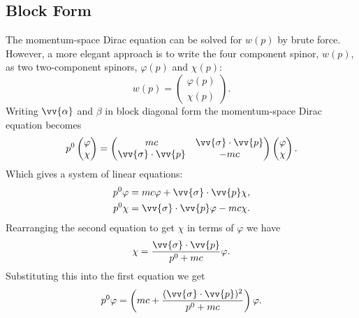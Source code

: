 \documentclass[fleqn]{NotesClass}
\begin{document}
    \subsection{Block Form}
    The momentum-space Dirac equation can be solved for \(w(p)\) by brute force.
    However, a more elegant approach is to write the four component spinor, \(w(p)\), as two two-component spinors, \(\varphi(p)\) and \(\chi(p)\):
    \begin{equation}
        w(p) = 
        \begin{pmatrix}
            \varphi(p)\\ \chi(p)
        \end{pmatrix}
        .
    \end{equation}
    Writing \(\vv{\alpha}\) and \(\beta\) in block diagonal form the momentum-space Dirac equation becomes
    \begin{equation}
        p^0
        \begin{pmatrix}
            \varphi\\ \chi
        \end{pmatrix}
        =
        \begin{pmatrix}
            mc & \vv{\sigma} \cdot \vv{p}\\
            \vv{\sigma} \cdot \vv{p} & -mc
        \end{pmatrix}
        \begin{pmatrix}
            \varphi\\ \chi
        \end{pmatrix}
        .
    \end{equation}
    Which gives a system of linear equations:
    \begin{align}
        p^0\varphi &= mc\varphi + \vv{\sigma}\cdot\vv{p} \chi,\label{eqn:dirac eqn solution step eq1}\\
        p^0\chi &= \vv{\sigma} \cdot \vv{p}\varphi - mc \chi.\label{eqn:dirac eqn solution step eq2}
    \end{align}
    Rearranging the second equation to get \(\chi\) in terms of \(\varphi\) we have
    \begin{equation}
        \chi = \frac{\vv{\sigma} \cdot \vv{p}}{p^0 + mc}\varphi.
    \end{equation}
    Substituting this into the first equation we get
    \begin{equation}
        p^0\varphi = \left( mc + \frac{(\vv{\sigma}\cdot\vv{p})^2}{p^0 + mc} \right)\varphi.
    \end{equation}
    
\end{document}
